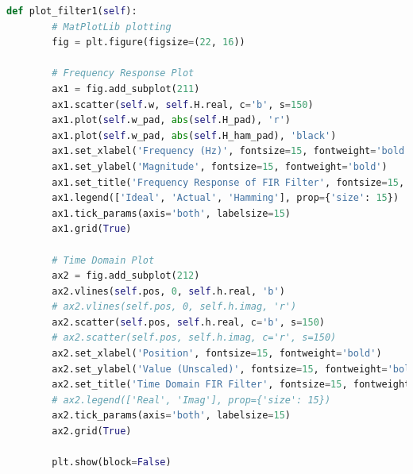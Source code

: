 \documentclass[a4paper, 11pt]{exam}
\begin{document}
\begin{lstlisting}[language=Python]
    def plot_filter1(self):
        # MatPlotLib plotting
        fig = plt.figure(figsize=(22, 16))

        # Frequency Response Plot
        ax1 = fig.add_subplot(211)
        ax1.scatter(self.w, self.H.real, c='b', s=150)
        ax1.plot(self.w_pad, abs(self.H_pad), 'r')
        ax1.plot(self.w_pad, abs(self.H_ham_pad), 'black')
        ax1.set_xlabel('Frequency (Hz)', fontsize=15, fontweight='bold')
        ax1.set_ylabel('Magnitude', fontsize=15, fontweight='bold')
        ax1.set_title('Frequency Response of FIR Filter', fontsize=15, fontweight='bold')
        ax1.legend(['Ideal', 'Actual', 'Hamming'], prop={'size': 15})
        ax1.tick_params(axis='both', labelsize=15)
        ax1.grid(True)

        # Time Domain Plot
        ax2 = fig.add_subplot(212)
        ax2.vlines(self.pos, 0, self.h.real, 'b')
        # ax2.vlines(self.pos, 0, self.h.imag, 'r')
        ax2.scatter(self.pos, self.h.real, c='b', s=150)
        # ax2.scatter(self.pos, self.h.imag, c='r', s=150)
        ax2.set_xlabel('Position', fontsize=15, fontweight='bold')
        ax2.set_ylabel('Value (Unscaled)', fontsize=15, fontweight='bold')
        ax2.set_title('Time Domain FIR Filter', fontsize=15, fontweight='bold')
        # ax2.legend(['Real', 'Imag'], prop={'size': 15})
        ax2.tick_params(axis='both', labelsize=15)
        ax2.grid(True)

        plt.show(block=False)
\end{lstlisting}
\end{document}
